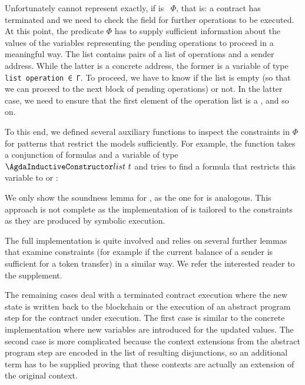 Unfortunately  cannot represent 
exactly, if  is ~$\Phi$, that is: a
contract has terminated and we need to check the 
field for further operations to be executed. 
At this point, the predicate $\Phi$ has to supply sufficient information about the values of the variables
representing the pending operations to proceed in a meaningful way.
The  list contains pairs of a list of operations and a
sender address. While the latter is a concrete address, the former is
a variable of type \verb/list operation ∈ Γ/. To proceed, we have to
know if the list  is empty (so that we can proceed to the next block
of pending operations) or not. In the latter case, we need to ensure
that the first element of the operation list is a
, and so on.

To this end, we defined several auxiliary functions to inspect the
constraints in $\Phi$ for patterns that restrict the models
sufficiently. For example, the function  takes a
conjunction of formulas and a variable of type $\ACon{list}~t$ and
tries to find a formula that restricts this variable to  or
:
\AbstractFindTTList
\SoundnessFindTTList

We only show the soundness lemma for , as the one for
 is analogous. This approach is not complete as the
implementation of  is tailored to the constraints
as they are produced by symbolic execution. 

The full implementation is quite involved and relies on several
further lemmas that examine constraints (for example if the current
balance of a sender is sufficient for a token transfer) in a similar
way. We refer the interested reader to the supplement.

The remaining cases deal with a terminated contract execution where
the new state is written back to the blockchain or the execution of an abstract program step for the contract under execution.
The first case is similar to the concrete implementation where new variables are introduced
for the updated values.
The second case is more complicated because the context extensions from the abstract program step
are encoded in the list of resulting disjunctions,
so an additional term has to be supplied proving that these contexts are actually an extension
of the original context.


